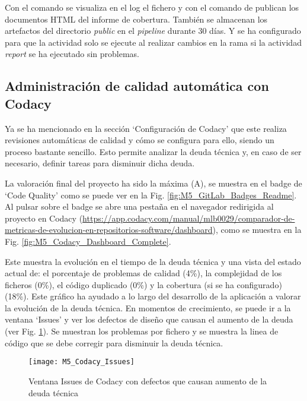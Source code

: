 Con el comando  se visualiza en el log el fichero  y con el comando  de publican los documentos HTML del informe de cobertura. También se almacenan los artefactos del directorio \textit{public} en el \textit{pipeline} durante 30 días. Y se ha configurado para que la actividad solo se ejecute al realizar cambios en la rama  si la actividad \textit{report} se ha ejecutado sin problemas.

\subsection{Administración de calidad automática con Codacy}

Ya se ha mencionado en la sección `Configuración de Codacy' que este realiza revisiones automáticas de calidad y cómo se configura para ello, siendo un proceso bastante sencillo. Esto permite analizar la deuda técnica y, en caso de ser necesario, definir tareas para disminuir dicha deuda. 

La valoración final del proyecto ha sido la máxima (A), se muestra en el badge de `Code Quality' como se puede ver en la Fig. \ref{fig:M5_GitLab_Badges_Readme}. Al pulsar sobre el badge se abre una pestaña en el navegador redirigida al proyecto en Codacy (\url{https://app.codacy.com/manual/mlb0029/comparador-de-metricas-de-evolucion-en-repositorios-software/dashboard}), como se muestra en la Fig. \ref{fig:M5_Codacy_Dashboard_Complete}.


Este muestra la evolución en el tiempo de la deuda técnica y una vista del estado actual de: el porcentaje de problemas de calidad (4\%), la complejidad de los ficheros (0\%), el código duplicado (0\%) y la cobertura (si se ha configurado) (18\%). Este gráfico ha ayudado a lo largo del desarrollo de la aplicación a valorar la evolución de la deuda técnica. En momentos de crecimiento, se puede ir a la ventana `Issues'  y ver los defectos de diseño que causan el aumento de la deuda (ver Fig. \ref{fig:M5_Codacy_Issues}). Se muestran los problemas por fichero y se muestra la linea de código que se debe corregir para disminuir la deuda técnica.

\begin{figure}[!h]
	\centering
	\texttt{[image: M5\_Codacy\_Issues]}
	\caption{Ventana Issues de Codacy con defectos que causan aumento de la deuda técnica}\label{fig:M5_Codacy_Issues}
\end{figure}
\FloatBarrier

